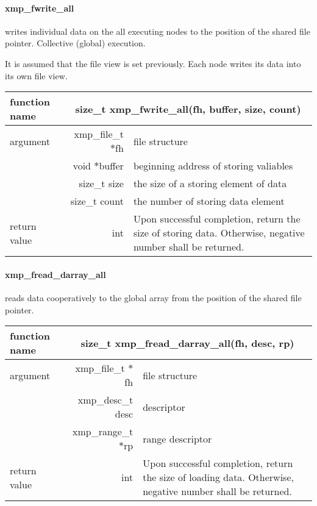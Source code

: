    \paragraph{ xmp\_fwrite\_all} writes individual data on the all executing nodes to the position of the shared file
   pointer. Collective (global) execution.

   It is assumed that the file view is set previously. Each node writes its data into its own file view.

   \begin{table}[h]
    \begin{center}
     \begin{tabular}{|l|r|p{80mm}|}
      \hline
      {\bf function name}  & \multicolumn{2}{c|}{\bf size\_t
      xmp\_fwrite\_all(fh, buffer, size, count)}  \\ \hline \hline
      argument & xmp\_file\_t $*$fh & file structure \\ \cline{2-3}
      & void $*$buffer & beginning address of storing valiables \\ \cline{2-3}
      & size\_t size & the size of a storing element of data \\ \cline{2-3}
      & size\_t count & the number of storing data element \\ \hline
      return value & int & Upon successful completion, return the size
	      of storing data. Otherwise, negative number shall be
	      returned. \\ \hline
      \end{tabular}
     \end{center}
    \label{tb:aaa}
   \end{table}

   \clearpage

   \paragraph{ xmp\_fread\_darray\_all} reads data cooperatively to the global array from the
   position of the shared file pointer.

   \begin{table}[h]
    \begin{center}
     \begin{tabular}{|l|r|p{80mm}|}
      \hline
      {\bf function name}  & \multicolumn{2}{c|}{\bf size\_t
      xmp\_fread\_darray\_all(fh, desc, rp)} \\ \hline \hline
      argument & xmp\_file\_t $*$fh & file structure \\ \cline{2-3}
      & xmp\_desc\_t desc & descriptor \\ \cline{2-3}
      & xmp\_range\_t $*$rp & range descriptor \\ \hline
      return value & int & Upon successful completion, return the size
	      of loading data. Otherwise, negative number shall be
	      returned. \\ \hline
      \end{tabular}
     \end{center}
    \label{tb:aaa}
   \end{table}

